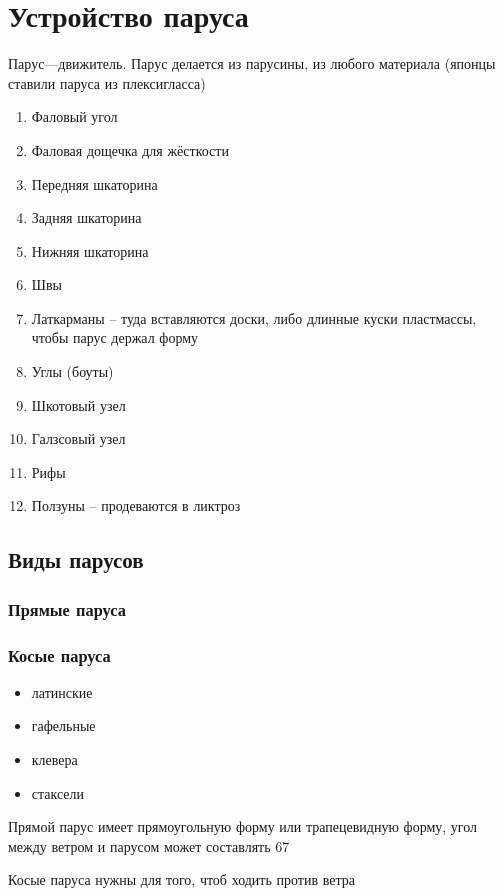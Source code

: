 \documentclass{article}        %
\begin{document}

\section{Устройство паруса}          
Парус---движитель. Парус делается из парусины, из любого материала (японцы ставили паруса из плексигласса)

\begin{enumerate}
	\item Фаловый угол 
	\item Фаловая дощечка для жёсткости 
	\item Передняя шкаторина
	\item Задняя шкаторина
	\item Нижняя шкаторина
	\item Швы
	\item Латкарманы -- туда вставляются доски, либо длинные куски пластмассы, чтобы парус держал форму
	\item Углы (боуты)
	\item Шкотовый узел
	\item Галзсовый узел
	\item Рифы
	\item Ползуны -- продеваются в ликтроз
\end{enumerate}

\subsection{Виды парусов}
\subsubsection{Прямые паруса}
\subsubsection{Косые паруса}
\begin{itemize}
	\item латинские
\item гафельные
	\item клевера
	\item стаксели
\end{itemize}

Прямой парус имеет прямоугольную форму или трапецевидную форму, угол между ветром и парусом может составлять 67\degree 

Косые паруса нужны для того, чтоб ходить против ветра
\end{document}
